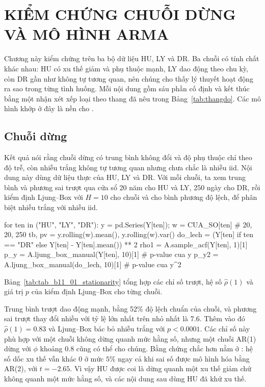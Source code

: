 \clearpage
\section[Kiểm chứng chuỗi dừng và mô hình ARMA]{KIỂM CHỨNG CHUỖI DỪNG VÀ MÔ HÌNH ARMA}

Chương này kiểm chứng  trên ba bộ dữ liệu HU, LY và DR. Ba chuỗi có tính chất khác nhau: HU có xu thế giảm và phụ thuộc mạnh, LY dao động theo chu kỳ, còn DR gần như không tự tương quan, nên chúng cho thấy lý thuyết hoạt động ra sao trong từng tình huống. Mỗi nội dung gồm sáu phần cố định và kết thúc bằng một nhận xét xếp loại theo thang đã nêu trong Bảng~\ref{tab:thangdo}. Các mô hình khớp ở đây là nền cho .

\subsection{Chuỗi dừng}

 Kết quả  nói rằng chuỗi dừng có trung bình không đổi và độ phụ thuộc chỉ theo độ trễ, còn nhiễu trắng không tự tương quan nhưng chưa chắc là nhiễu iid.
 Nội dung này dùng dữ liệu thực của HU, LY và DR. Với mỗi chuỗi, ta xem trung bình và phương sai trượt qua cửa sổ 20 năm cho HU và LY, 250 ngày cho DR, rồi kiểm định Ljung--Box với $H=10$ cho chuỗi và cho bình phương độ lệch, để phân biệt nhiễu trắng với nhiễu iid.
\begin{codeblock}
for ten in ("HU", "LY", "DR"):
    y = pd.Series(Y[ten]); w = CUA_SO[ten]                 # 20, 20, 250
    tb, pv = y.rolling(w).mean(), y.rolling(w).var()
    do_lech = (Y[ten] if ten == "DR" else Y[ten] - Y[ten].mean()) ** 2
    rho1 = A.sample_acf(Y[ten], 1)[1]
    p_y = A.ljung_box_manual(Y[ten], 10)[1]                # p-value cua y
    p_y2 = A.ljung_box_manual(do_lech, 10)[1]              # p-value cua y^2
\end{codeblock}
 Bảng~\ref{tab:tab_b11_01_stationarity} tổng hợp các chỉ số trượt, hệ số $\hat\rho(1)$ và giá trị $p$ của kiểm định Ljung--Box cho từng chuỗi.

 Trung bình trượt dao động mạnh, bằng 52\% độ lệch chuẩn của chuỗi, và phương sai trượt thay đổi nhiều với tỷ lệ lớn nhất trên nhỏ nhất là $7.6$. Thêm vào đó $\hat\rho(1)=0.83$ và Ljung--Box bác bỏ nhiễu trắng với $p<0.0001$. Các chỉ số này phù hợp với một chuỗi không dừng quanh mức hằng số, nhưng một chuỗi AR(1) dừng với $\phi$ khoảng $0.8$ cũng có thể cho chúng. Bằng chứng chắc hơn nằm ở : hệ số dốc xu thế vẫn khác $0$ ở mức $5\%$ ngay cả khi sai số được mô hình hóa bằng AR(2), với $t=-2.65$. Vì vậy HU được coi là dừng quanh một xu thế giảm chứ không quanh một mức hằng số, và các nội dung sau dùng HU đã khử xu thế.

